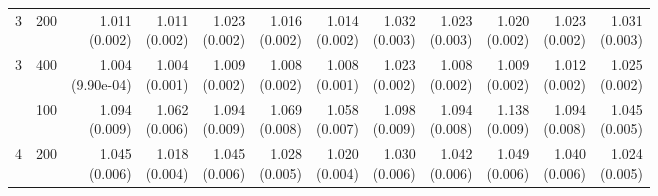 \begin{table}[p]
{\begin{tabular}{llrrrrrrrrrr}
3 & 200 & \shortstack{1.011\\(0.002)} & \shortstack{1.011\\(0.002)} & \shortstack{1.023\\(0.002)} & \shortstack{1.016\\(0.002)} & \shortstack{1.014\\(0.002)} & \shortstack{1.032\\(0.003)} & \shortstack{1.023\\(0.003)} & \shortstack{1.020\\(0.002)} & \shortstack{1.023\\(0.002)} & \shortstack{1.031\\(0.003)} \\
3 & 400 & \shortstack{1.004\\(9.90e-04)} & \shortstack{1.004\\(0.001)} & \shortstack{1.009\\(0.002)} & \shortstack{1.008\\(0.002)} & \shortstack{1.008\\(0.001)} & \shortstack{1.023\\(0.002)} & \shortstack{1.008\\(0.002)} & \shortstack{1.009\\(0.002)} & \shortstack{1.012\\(0.002)} & \shortstack{1.025\\(0.002)} \\
\addlinespace
4 & 100 & \shortstack{1.094\\(0.009)} & \shortstack{1.062\\(0.006)} & \shortstack{1.094\\(0.009)} & \shortstack{1.069\\(0.008)} & \shortstack{1.058\\(0.007)} & \shortstack{1.098\\(0.009)} & \shortstack{1.094\\(0.008)} & \shortstack{1.138\\(0.009)} & \shortstack{1.094\\(0.008)} & \shortstack{1.045\\(0.005)} \\
4 & 200 & \shortstack{1.045\\(0.006)} & \shortstack{1.018\\(0.004)} & \shortstack{1.045\\(0.006)} & \shortstack{1.028\\(0.005)} & \shortstack{1.020\\(0.004)} & \shortstack{1.030\\(0.006)} & \shortstack{1.042\\(0.006)} & \shortstack{1.049\\(0.006)} & \shortstack{1.040\\(0.006)} & \shortstack{1.024\\(0.005)} \\

\end{tabular}}
\end{table}
